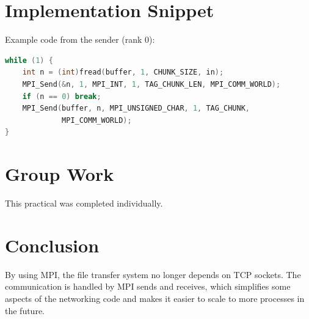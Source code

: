 \documentclass[a4paper,11pt]{article}
\begin{document}
\section{Implementation Snippet}
Example code from the sender (rank 0):

\begin{lstlisting}[language=C]
while (1) {
    int n = (int)fread(buffer, 1, CHUNK_SIZE, in);
    MPI_Send(&n, 1, MPI_INT, 1, TAG_CHUNK_LEN, MPI_COMM_WORLD);
    if (n == 0) break;
    MPI_Send(buffer, n, MPI_UNSIGNED_CHAR, 1, TAG_CHUNK,
             MPI_COMM_WORLD);
}
\end{lstlisting}

\section{Group Work}
This practical was completed individually.

\section{Conclusion}
By using MPI, the file transfer system no longer depends on TCP
sockets. The communication is handled by MPI sends and receives,
which simplifies some aspects of the networking code and makes it
easier to scale to more processes in the future.
\end{document}
